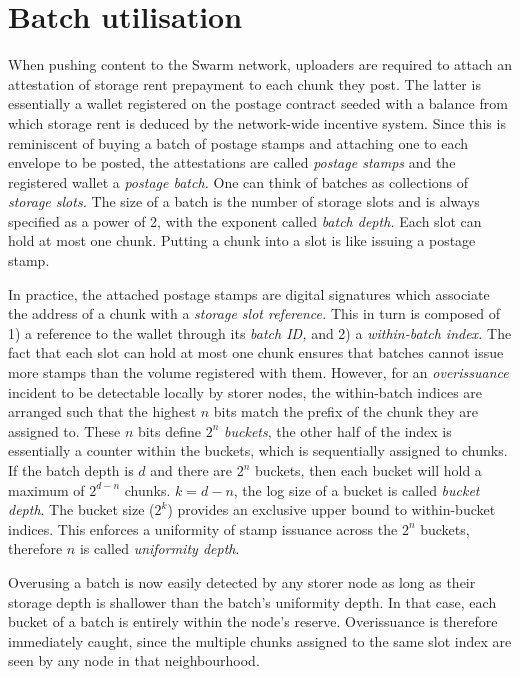 \section{Batch utilisation}\label{sec:batch-utilisation}


When pushing content to the Swarm network, uploaders are required to
attach an attestation of storage rent prepayment to each chunk they
post. The latter is essentially a wallet registered on the postage
contract seeded with a balance from which storage rent is deduced by the
network-wide incentive system. Since this is reminiscent of buying a
batch of postage stamps and attaching one to each envelope to be posted,
the attestations are called \emph{postage stamps} and the registered
wallet a \emph{postage batch.} One can think of batches as collections
of \emph{storage slots.} The size of a batch is the number of storage
slots and is always specified as a power of 2, with the exponent
called \emph{batch depth.} Each slot can hold at most one chunk.
Putting a chunk into a slot is like issuing a postage stamp.

In practice, the attached postage stamps are digital signatures which
associate the address of a chunk with a \emph{storage slot reference.}
This in turn is composed of 1) a reference to the wallet through its
\emph{batch ID,} and 2) a \emph{within-batch index.} The fact that each
slot can hold at most one chunk ensures that batches cannot issue more
stamps than the volume registered with them. However, for an
\emph{overissuance} incident to be detectable locally by storer nodes,
the within-batch indices are arranged such that the highest $n$ bits
match the prefix of the chunk they are assigned to. These $n$ bits
define $2^n$ \emph{buckets}, the other half of the index is essentially a counter within the buckets, which is
sequentially assigned to chunks. If
the batch depth is $d$ and there
are $2^n$ buckets, then each bucket will hold a maximum of $2^{d-n}$
chunks. $k=d-n$, the log size of a bucket is called
\emph{bucket depth}. The bucket size ($2^k$) provides an exclusive upper bound to
within-bucket indices. This enforces a uniformity of stamp issuance across the $2^n$ buckets, therefore $n$ is called \emph{uniformity depth}.

Overusing a batch is now easily detected by any storer node as long as
their storage depth is shallower than the batch's uniformity depth. In
that case, each bucket of a batch is entirely within the node's reserve.
Overissuance is therefore immediately caught, since the multiple chunks 
assigned to the same slot index are seen by any node in that
neighbourhood.


